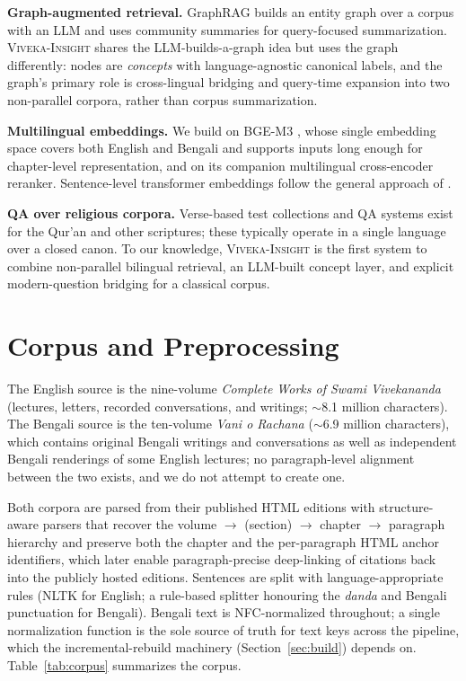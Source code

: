 \documentclass[11pt,a4paper]{article}
\newcommand{\system}{\textsc{Viveka-Insight}}
\begin{document}
\textbf{Graph-augmented retrieval.} GraphRAG \cite{edge2024graphrag}
builds an entity graph over a corpus with an LLM and uses community
summaries for query-focused summarization. \system{} shares the
LLM-builds-a-graph idea but uses the graph differently: nodes are
\emph{concepts} with language-agnostic canonical labels, and the graph's
primary role is cross-lingual bridging and query-time expansion into two
non-parallel corpora, rather than corpus summarization.

\textbf{Multilingual embeddings.} We build on BGE-M3
\cite{chen2024bgem3}, whose single embedding space covers both English
and Bengali and supports inputs long enough for chapter-level
representation, and on its companion multilingual cross-encoder reranker.
Sentence-level transformer embeddings follow the general approach of
\cite{reimers2019sbert}.

\textbf{QA over religious corpora.} Verse-based test collections and QA
systems exist for the Qur'an \cite{malhas2020ayatec} and other
scriptures; these typically operate in a single language over a closed
canon. To our knowledge, \system{} is the first system to combine
non-parallel bilingual retrieval, an LLM-built concept layer, and
explicit modern-question bridging for a classical corpus.

\section{Corpus and Preprocessing}
\label{sec:corpus}

The English source is the nine-volume \emph{Complete Works of Swami
Vivekananda} (lectures, letters, recorded conversations, and writings;
$\sim$8.1 million characters). The Bengali source is the ten-volume
\emph{Vani o Rachana} ($\sim$6.9 million characters), which contains
original Bengali writings and conversations as well as independent
Bengali renderings of some English lectures; no paragraph-level alignment
between the two exists, and we do not attempt to create one.

Both corpora are parsed from their published HTML editions with
structure-aware parsers that recover the volume $\to$ (section) $\to$
chapter $\to$ paragraph hierarchy and preserve both the chapter and the
per-paragraph HTML anchor identifiers, which later enable paragraph-precise
deep-linking of citations back into the publicly hosted editions. Sentences are split with language-appropriate
rules (NLTK \cite{bird2004nltk} for English; a rule-based splitter
honouring the \emph{danda} and Bengali punctuation for Bengali). Bengali
text is NFC-normalized throughout; a single normalization function is the
sole source of truth for text keys across the pipeline, which the
incremental-rebuild machinery (Section~\ref{sec:build}) depends on.
Table~\ref{tab:corpus} summarizes the corpus.
\end{document}
